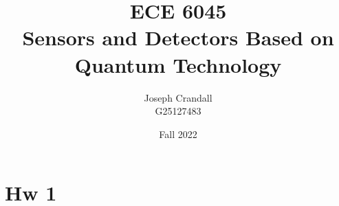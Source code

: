 
\usepackage{algorithm, algpseudocode, bm, color, gensymb, listings, siunitx, soul, subfiles, verbatim}
\usepackage[a4paper, total={7.5in, 10in}]{geometry}

\title{ECE 6045 \\ Sensors and Detectors Based on Quantum Technology}
\author{Joseph Crandall \\ G25127483}
\date{Fall 2022}


\maketitle

\section{Hw 1}


